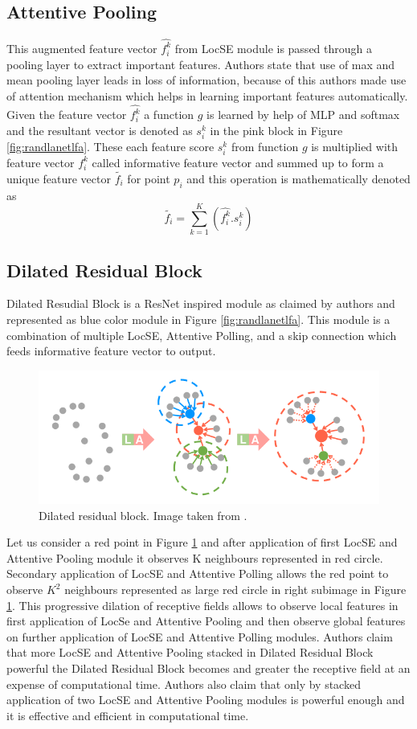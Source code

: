 \subsection{Attentive Pooling}
This augmented feature vector $\hat{f_i^k}$ from LocSE module is passed through a pooling layer to extract important features.
Authors state that use of max and mean pooling layer leads in loss of information, because of this authors made use of attention mechanism which helps in learning important features automatically.
Given the feature vector $\hat{f_i^k}$ a function $g$ is learned by help of MLP and softmax and the resultant vector is denoted as $s_i^k$ in the pink block in Figure \ref{fig:randlanetlfa}.
These each feature score $s_i^k$ from function $g$ is multiplied with feature vector $f_i^k$ called informative feature vector and summed up to form a unique feature vector $\tilde{f_i}$ for point $p_i$ and this operation is mathematically denoted as
$$
\tilde{f_i}= \sum_{k=1}^K (\hat{f_i^k}.s_i^k)
$$

\subsection{Dilated Residual Block}
Dilated Resudial Block is a ResNet inspired module as claimed by authors and represented as blue color module in Figure \ref{fig:randlanetlfa}.
This module is a combination of multiple LocSE, Attentive Polling, and a skip connection which feeds informative feature vector to output.
\begin{figure}
    \centering
    \includegraphics[scale=0.5]{images/dilatedresidualblock.png}
    \caption{Dilated residual block. Image taken from \cite{Hu_2020_CVPR_Randla}.}
    \label{fig:dilatedresidualblock}
\end{figure}
Let us consider a red point in Figure \ref{fig:dilatedresidualblock} and after application of first LocSE and Attentive Pooling module it observes K neighbours represented in red circle.
Secondary application of LocSE and Attentive Polling allows the red point to observe $K^{2}$ neighbours represented as large red circle in right subimage in Figure \ref{fig:dilatedresidualblock}.
This progressive dilation of receptive fields allows to observe local features in first application of LocSe and Attentive Pooling and then observe global features on further application of LocSE and Attentive Polling modules.
Authors claim that more LocSE and Attentive Pooling stacked in Dilated Residual Block powerful the Dilated Residual Block becomes and greater the receptive field at an expense of computational time.
Authors also claim that only by stacked application of two LocSE and Attentive Pooling modules is powerful enough and it is effective and efficient in computational time.


